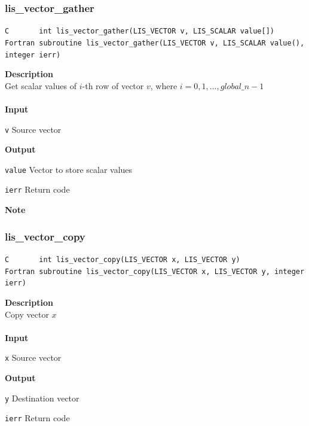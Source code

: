 \documentclass[a4paper]{article}
\newcommand{\namelistlabel}[1]{\mbox{#1}\hfill}
\newenvironment{namelist}[1]{%
 \begin{list}{}
  {\let\makelabel\namelistlabel
  \settowidth{\labelwidth}{#1}
  \setlength{\leftmargin}{1.1\labelwidth}}
}{%
\end{list}}
\begin{document}
  \subsubsection{lis\_vector\_gather}
\begin{screen}
\verb|C       int lis_vector_gather(LIS_VECTOR v, LIS_SCALAR value[])|\\
\verb|Fortran subroutine lis_vector_gather(LIS_VECTOR v, LIS_SCALAR value(), integer ierr)|
\end{screen}
{\bf Description}\\
\indent
Get scalar values of $i$-th row of vector $v$, 
where $i=0,1,..., global\_n-1$
\\ \\
\noindent
{\bf Input}
\begin{namelist}{XXXXXXXXXXXXXXXXXXXX}
\item[\tt v] Source vector
\end{namelist}
{\bf Output}
\begin{namelist}{XXXXXXXXXXXXXXXXXXXX}
\item[\tt value] Vector to store scalar values
\item[\tt ierr] Return code
\end{namelist}
{\bf Note}\\
\indent
\newpage
  \subsubsection{lis\_vector\_copy}
\begin{screen}
\verb|C       int lis_vector_copy(LIS_VECTOR x, LIS_VECTOR y)|\\
\verb|Fortran subroutine lis_vector_copy(LIS_VECTOR x, LIS_VECTOR y, integer ierr)|
\end{screen}
{\bf Description}\\
\indent
Copy vector $x$
\\ \\
\noindent
{\bf Input}
\begin{namelist}{XXXXXXXXXXXXXXXXXXXX}
\item[\tt x] Source vector
\end{namelist}
{\bf Output}
\begin{namelist}{XXXXXXXXXXXXXXXXXXXX}
\item[\tt y] Destination vector
\item[\tt ierr] Return code
\end{namelist}
\end{document}
